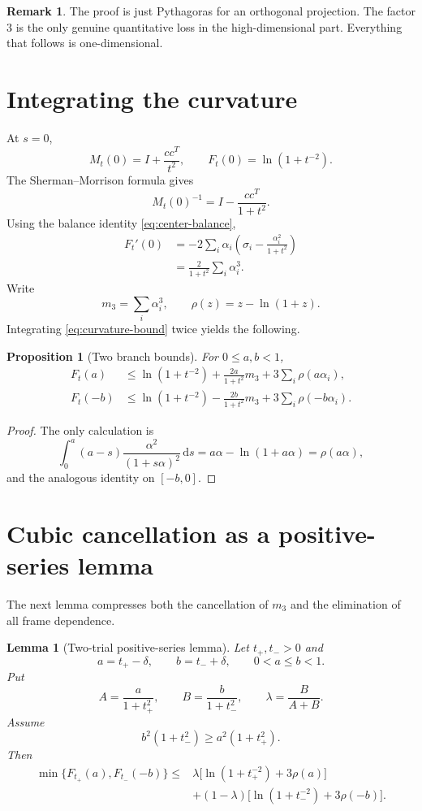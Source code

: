 \documentclass[11pt]{article}
\newtheorem{lemma}[theorem]{Lemma}
\newtheorem{proposition}[theorem]{Proposition}
\theoremstyle{definition}
\newtheorem{remark}[theorem]{Remark}
\newcommand{\1}{\mathbf{1}}
\newcommand{\dd}{\,\mathrm{d}}
\begin{document}
\begin{remark}
The proof is just Pythagoras for an orthogonal projection.  The factor $3$ is the only genuine quantitative loss in the high-dimensional part.  Everything that follows is one-dimensional.
\end{remark}

\section{Integrating the curvature}

At $s=0$,
\[
M_t(0)=I+\frac{cc^T}{t^2},
\qquad
F_t(0)=\ln(1+t^{-2}).
\]
The Sherman--Morrison formula gives
\[
M_t(0)^{-1}=I-\frac{cc^T}{1+t^2}.
\]
Using the balance identity \eqref{eq:center-balance},
\begin{align}
F_t'(0)
&=-2\sum_i\alpha_i\left(\sigma_i-\frac{\alpha_i^2}{1+t^2}\right)\\
&=\frac{2}{1+t^2}\sum_i\alpha_i^3.
\label{eq:first-derivative}
\end{align}
Write
\[
m_3=\sum_i\alpha_i^3,
\qquad
\rho(z)=z-\ln(1+z).
\]
Integrating \eqref{eq:curvature-bound} twice yields the following.

\begin{proposition}[Two branch bounds]
For $0\le a,b<1$,
\begin{align}
F_t(a)
&\le \ln(1+t^{-2})
 +\frac{2a}{1+t^2}m_3
 +3\sum_i\rho(a\alpha_i),
\label{eq:positive-integrated}\\
F_t(-b)
&\le \ln(1+t^{-2})
 -\frac{2b}{1+t^2}m_3
 +3\sum_i\rho(-b\alpha_i).
\label{eq:negative-integrated}
\end{align}
\end{proposition}

\begin{proof}
The only calculation is
\[
\int_0^a(a-s)\frac{\alpha^2}{(1+s\alpha)^2}\dd s
=a\alpha-\ln(1+a\alpha)=\rho(a\alpha),
\]
and the analogous identity on $[-b,0]$.
\end{proof}

\section{Cubic cancellation as a positive-series lemma}

The next lemma compresses both the cancellation of $m_3$ and the elimination of all frame dependence.

\begin{lemma}[Two-trial positive-series lemma]
Let $t_+,t_->0$ and
\[
a=t_+-\delta,
\qquad
b=t_-+\delta,
\qquad
0<a\le b<1.
\]
Put
\[
A=\frac{a}{1+t_+^2},
\qquad
B=\frac{b}{1+t_-^2},
\qquad
\lambda=\frac{B}{A+B}.
\]
Assume
\begin{equation}
b^2(1+t_-^2)\ge a^2(1+t_+^2).
\label{eq:cubic-condition}
\end{equation}
Then
\begin{align}
\min\{F_{t_+}(a),F_{t_-}(-b)\}
\le{}&\lambda\bigl[\ln(1+t_+^{-2})+3\rho(a)\bigr]\\
&+(1-\lambda)\bigl[\ln(1+t_-^{-2})+3\rho(-b)\bigr].
\label{eq:two-trial-scalar}
\end{align}
\end{lemma}
\end{document}
